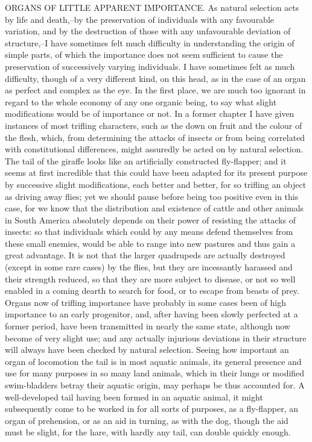 ORGANS OF LITTLE APPARENT IMPORTANCE.
As natural selection acts by life and death,--by the preservation of individuals with any favourable variation, and by the destruction of those with any unfavourable deviation of structure,--I have sometimes felt much difficulty in understanding the origin of simple parts, of which the importance does not seem sufficient to cause the preservation of successively varying individuals. I have sometimes felt as much difficulty, though of a very different kind, on this head, as in the case of an organ as perfect and complex as the eye.
In the first place, we are much too ignorant in regard to the whole economy of any one organic being, to say what slight modifications would be of importance or not. In a former chapter I have given instances of most trifling characters, such as the down on fruit and the colour of the flesh, which, from determining the attacks of insects or from being correlated with constitutional differences, might assuredly be acted on by natural selection. The tail of the giraffe looks like an artificially constructed fly-flapper; and it seems at first incredible that this could have been adapted for its present purpose by successive slight modifications, each better and better, for so trifling an object as driving away flies; yet we should pause before being too positive even in this case, for we know that the distribution and existence of cattle and other animals in South America absolutely depends on their power of resisting the attacks of insects: so that individuals which could by any means defend themselves from these small enemies, would be able to range into new pastures and thus gain a great advantage. It is not that the larger quadrupeds are actually destroyed (except in some rare cases) by the flies, but they are incessantly harassed and their strength reduced, so that they are more subject to disease, or not so well enabled in a coming dearth to search for food, or to escape from beasts of prey.
Organs now of trifling importance have probably in some cases been of high importance to an early progenitor, and, after having been slowly perfected at a former period, have been transmitted in nearly the same state, although now become of very slight use; and any actually injurious deviations in their structure will always have been checked by natural selection. Seeing how important an organ of locomotion the tail is in most aquatic animals, its general presence and use for many purposes in so many land animals, which in their lungs or modified swim-bladders betray their aquatic origin, may perhaps be thus accounted for. A well-developed tail having been formed in an aquatic animal, it might subsequently come to be worked in for all sorts of purposes, as a fly-flapper, an organ of prehension, or as an aid in turning, as with the dog, though the aid must be slight, for the hare, with hardly any tail, can double quickly enough.
